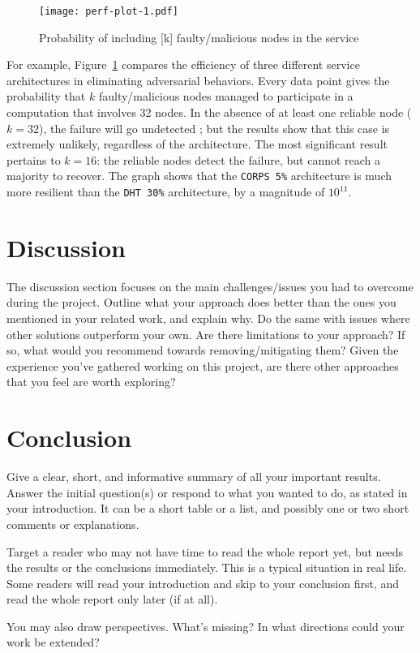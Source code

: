 \documentclass{scrartcl}
\begin{document}
\begin{figure}
	\begin{center}
		\texttt{[image: perf-plot-1.pdf]}
	\end{center}
	\caption{Probability of including [k] faulty/malicious nodes in the service}
	\label{graph:faulty-proportion-plot}
\end{figure}

For example, Figure~\ref{graph:faulty-proportion-plot} compares the efficiency of three different service architectures in eliminating adversarial behaviors. Every data point gives the probability that $k$ faulty/malicious nodes managed to participate in a computation that involves 32 nodes. In the absence of at least one reliable node ($k = 32$), the failure will go undetected ; but the results show that this case is extremely unlikely, regardless of the architecture. The most significant result pertains to $k = 16$: the reliable nodes detect the failure, but cannot reach a majority to recover. The graph shows that the \texttt{CORPS 5\%} architecture is much more resilient than the \texttt{DHT 30\%} architecture, by a magnitude of $10^{11}$.


\section{Discussion}
The discussion section focuses on the main challenges/issues you had to overcome during the project. Outline what your approach does better than the ones you mentioned in your related work, and explain why. Do the same with issues where other solutions  outperform your own. Are there limitations to your approach? If so, what would you recommend towards removing/mitigating them? Given the experience you've gathered working on this project, are there other approaches that you feel are worth exploring?

\section{Conclusion}

Give a clear, short, and informative summary of all your important results. Answer the initial question(s) or respond to what you wanted to do, as stated in your introduction. It can be a short table or a list, and possibly one or two short comments or explanations. 

Target a reader who may not have time to read the whole report yet, but needs the results or the conclusions immediately. This is a typical situation in real life. Some readers will read your introduction and skip to your conclusion first, and read the whole report only later (if at all).

You may also draw perspectives. What's missing? In what directions could your work be extended?

\newpage
\singlespacing




\end{document}
